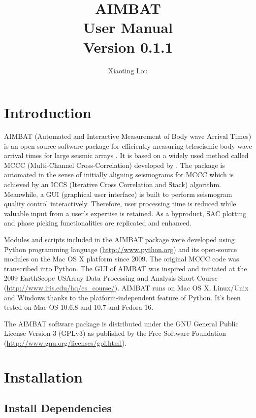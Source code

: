 \documentclass[12pt, titlepage]{article}
\title{AIMBAT \\ User Manual \\ Version 0.1.1}
\author[1*]{Xiaoting Lou}
\affil[1]{Department of Earth and Planetary Sciences, Northwestern University, Evanston, Illinois, USA}
\affil[*]{Email: xlou@u.northwestern.edu}
\begin{document}
\maketitle

\tableofcontents


\newpage
\section{Introduction}

AIMBAT (Automated and Interactive Measurement of Body wave Arrival Times) is an open-source software package for efficiently measuring teleseismic body wave arrival times for large seismic arrays \citep{pytool}.
It is based on a widely used method called MCCC (Multi-Channel Cross-Correlation) developed by \cite{mccc}.
The package is automated in the sense of initially aligning seismograms for MCCC which is achieved by an ICCS (Iterative Cross Correlation and Stack) algorithm.
Meanwhile, a GUI (graphical user interface) is built to perform seismogram quality control interactively.
Therefore, user processing time is reduced while valuable input from a user's expertise is retained. 
As a byproduct, SAC \citep{sac} plotting and phase picking functionalities are replicated and enhanced.

Modules and scripts included in the AIMBAT package were developed using Python programming language (\url{http://www.python.org}) and its open-source modules on the Mac OS X platform since 2009. The original MCCC code \citep{mccc} was transcribed into Python.
The GUI of AIMBAT was inspired and initiated at the 2009 EarthScope USArray Data Processing and Analysis Short Course (\url{http://www.iris.edu/hq/es\_course/}).
AIMBAT runs on Mac OS X, Linux/Unix and Windows thanks to the platform-independent feature of Python. 
It's been tested on Mac OS 10.6.8 and 10.7 and Fedora 16.

The AIMBAT software package is distributed under the GNU General Public License Version 3 (GPLv3) as published by the Free Software Foundation (\url{http://www.gnu.org/licenses/gpl.html}).




\newpage
\section{Installation}


\subsection{Install Dependencies}
\end{document}
